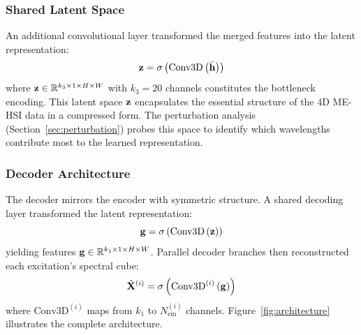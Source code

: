 \subsubsection{Shared Latent Space}
An additional convolutional layer transformed the merged features into the latent representation:
\begin{equation}
\mathbf{z} = \sigma\left(\text{Conv3D}\left(\bar{\mathbf{h}}\right)\right)
\label{eq:latent}
\end{equation}
where $\mathbf{z} \in \mathbb{R}^{k_3 \times 1 \times H \times W}$ with $k_3 = 20$ channels constitutes the bottleneck encoding.
This latent space $\mathbf{z}$ encapsulates the essential structure of the 4D ME-HSI data in a compressed form.
The perturbation analysis (Section~\ref{sec:perturbation}) probes this space to identify which wavelengths contribute most to the learned representation.

\subsubsection{Decoder Architecture}
The decoder mirrors the encoder with symmetric structure.
A shared decoding layer transformed the latent representation:
\begin{equation}
\mathbf{g} = \sigma\left(\text{Conv3D}\left(\mathbf{z}\right)\right)
\label{eq:decode_shared}
\end{equation}
yielding features $\mathbf{g} \in \mathbb{R}^{k_1 \times 1 \times H \times W}$.
Parallel decoder branches then reconstructed each excitation's spectral cube:
\begin{equation}
\hat{\mathbf{X}}^{(i)} = \sigma\left(\text{Conv3D}^{(i)}\left(\mathbf{g}\right)\right)
\label{eq:decode_branch}
\end{equation}
where $\text{Conv3D}^{(i)}$ maps from $k_1$ to $N_{\text{em}}^{(i)}$ channels.
Figure~\ref{fig:architecture} illustrates the complete architecture.

